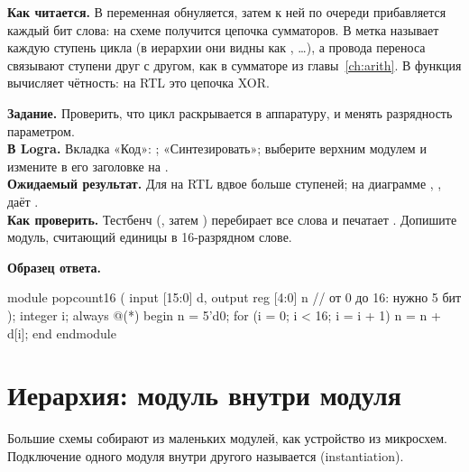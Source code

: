 
\textbf{Как читается.} В  переменная  обнуляется,
затем к ней по очереди прибавляется каждый бит слова: на схеме получится цепочка
сумматоров. В  метка  называет каждую ступень цикла
(в иерархии они видны как , \ldots), а провода
переноса  связывают ступени друг с другом, как в сумматоре из
главы~\ref{ch:arith}. В  функция вычисляет чётность: на RTL это
цепочка XOR.

\begin{diybox}
\textbf{Задание.} Проверить, что цикл раскрывается в аппаратуру, и менять разрядность параметром.\\
\textbf{В Logra.} Вкладка «Код»: ; «Синтезировать»; выберите верхним модулем  и измените в его заголовке  на .\\
\textbf{Ожидаемый результат.} Для  на RTL вдвое больше ступеней; на диаграмме , ,  даёт .\\
\textbf{Как проверить.} Тестбенч  (, затем ) перебирает все слова и печатает .
 Допишите модуль, считающий единицы в 16-разрядном слове.
\end{diybox}

\textbf{Образец ответа.}\par\nopagebreak
\begin{vcode}
module popcount16 (
    input      [15:0] d,
    output reg [4:0]  n         // от 0 до 16: нужно 5 бит
);
    integer i;
    always @(*) begin
        n = 5'd0;
        for (i = 0; i < 16; i = i + 1)
            n = n + d[i];
    end
endmodule
\end{vcode}


\section{Иерархия: модуль внутри модуля}

Большие схемы собирают из маленьких модулей, как устройство из микросхем.
Подключение одного модуля внутри другого называется 
(instantiation).

